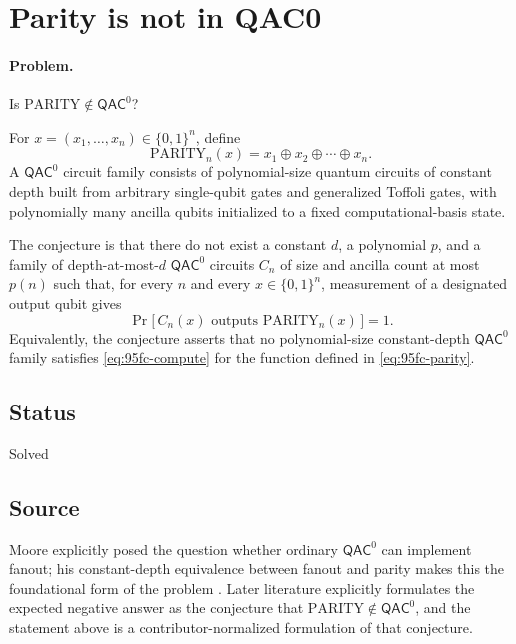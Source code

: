 \section{Parity is not in QAC0}
\label{sec:op_95fccb9df34a08b1}

\paragraph{Problem.}
Is $\mathrm{PARITY}\notin\mathsf{QAC}^0$?

For $x=(x_1,\ldots,x_n)\in\{0,1\}^n$, define
\begin{equation}
  \mathrm{PARITY}_n(x)=x_1\oplus x_2\oplus\cdots\oplus x_n.
  \label{eq:95fc-parity}
\end{equation}
A $\mathsf{QAC}^0$ circuit family consists of polynomial-size quantum
circuits of constant depth built from arbitrary single-qubit gates and
generalized Toffoli gates, with polynomially many ancilla qubits initialized
to a fixed computational-basis state.

The conjecture is that there do not exist a constant $d$, a polynomial $p$,
and a family of depth-at-most-$d$ $\mathsf{QAC}^0$ circuits $C_n$ of size
and ancilla count at most $p(n)$ such that, for every $n$ and every
$x\in\{0,1\}^n$, measurement of a designated output qubit gives
\begin{equation}
  \Pr\bigl[\,C_n(x)\text{ outputs }\mathrm{PARITY}_n(x)\,\bigr]=1.
  \label{eq:95fc-compute}
\end{equation}
Equivalently, the conjecture asserts that no polynomial-size
constant-depth $\mathsf{QAC}^0$ family satisfies
\eqref{eq:95fc-compute} for the function defined in
\eqref{eq:95fc-parity}.

\subsection*{Status}

Solved

\subsection*{Source}

Moore explicitly posed the question whether ordinary $\mathsf{QAC}^0$ can
implement fanout; his constant-depth equivalence between fanout and parity
makes this the foundational form of the problem
.  Later literature explicitly formulates
the expected negative answer as the conjecture that
$\mathrm{PARITY}\notin\mathsf{QAC}^0$, and the statement above is a
contributor-normalized formulation of that conjecture.


